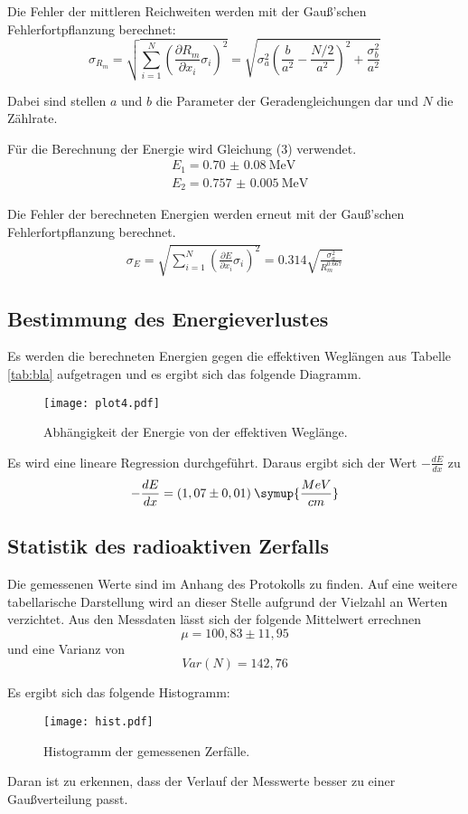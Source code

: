 Die Fehler der mittleren Reichweiten werden mit der Gauß'schen Fehlerfortpflanzung berechnet:
\begin{equation}
  \sigma_{R_m} = \sqrt{
      \sum\limits_{i = 1}^N
       \left( \frac{\partial R_m}{\partial x_i} \sigma_i \right)^{\!\! 2}
     } = \sqrt{\sigma_{a}^{2} \left(\frac{b}{a^{2}} - \frac{N/2}{a^{2}}\right)^{2} + \frac{\sigma_{b}^{2}}{a^{2}} }
\end{equation}

Dabei sind stellen $a$ und $b$ die Parameter der Geradengleichungen dar und $N$ die Zählrate.

Für die Berechnung der Energie wird Gleichung (3) verwendet.
\begin{align*}
  &E_1 = \SI{0.70(8)}{\mega\eV} \\
  &E_2 = \SI{0.757(5)}{\mega\eV}
\end{align*}

Die Fehler der berechneten Energien werden erneut mit der Gauß'schen Fehlerfortpflanzung berechnet.
\begin{align*}
  \sigma_{E} = \sqrt{
      \sum\limits_{i = 1}^N
       \left( \frac{\partial E}{\partial x_i} \sigma_i \right)^{\!\! 2}
     } = 0.314 \sqrt{\frac{\sigma_{a}^{2}}{R_m^{0.667}}}
\end{align*}


\subsection{Bestimmung des Energieverlustes}
Es werden die berechneten Energien gegen die effektiven Weglängen aus Tabelle \ref{tab:bla} aufgetragen und es ergibt sich das folgende Diagramm.
\begin{figure}[H]
  \centering
  \texttt{[image: plot4.pdf]}
  \caption{Abhängigkeit der Energie von der effektiven Weglänge.}
  \label{fig:plot4}
\end{figure}
Es wird eine lineare Regression durchgeführt. Daraus ergibt sich der Wert $-\frac{dE}{dx}$ zu
\begin{equation*}
  -\frac{dE}{dx} = (1,07 \pm 0,01) \: \symup{\frac{MeV}{cm}}
\end{equation*}

\subsection{Statistik des radioaktiven Zerfalls}
Die gemessenen Werte sind im Anhang des Protokolls zu finden. Auf eine weitere tabellarische
Darstellung wird an dieser Stelle aufgrund der Vielzahl an Werten verzichtet.
Aus den Messdaten lässt sich der folgende Mittelwert errechnen
\begin{equation*}
  \mu = 100,83 \pm 11,95
\end{equation*}
und eine Varianz von
\begin{equation*}
  Var(N) = 142,76
\end{equation*}

Es ergibt sich das folgende Histogramm:
\begin{figure}[H]
  \centering
  \texttt{[image: hist.pdf]}
  \caption{Histogramm der gemessenen Zerfälle.}
  \label{fig:hist}
\end{figure}

Daran ist zu erkennen, dass der Verlauf der Messwerte besser zu einer Gaußverteilung passt.

